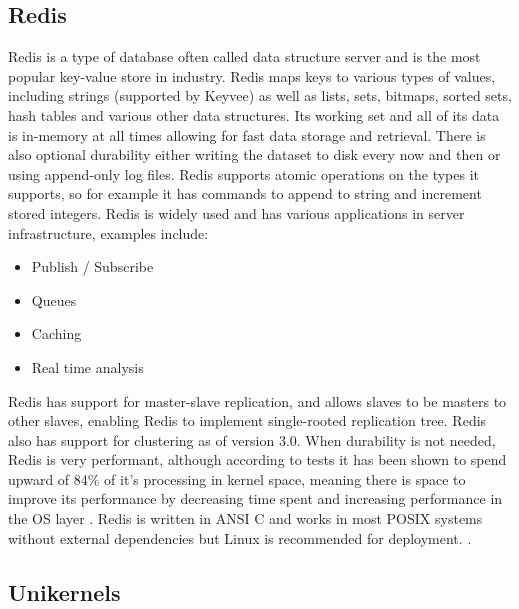 \documentclass[english,10pt,twocolumn]{article}
\begin{document}
\subsection{Redis}

Redis is a type of database often called data structure server and is the most popular key-value store in industry\cite{dbengines}.
Redis maps keys to various types of values, including strings (supported by Keyvee) as well as lists, sets, bitmaps, sorted sets, hash tables and various other data structures.
Its working set and all of its data is in-memory at all times allowing for fast data storage and retrieval.
There is also optional durability either writing the dataset to disk every now and then or using append-only log files.
Redis supports atomic operations on the types it supports, so for example it has commands to append to string and increment stored integers.
Redis is widely used and has various applications in server infrastructure, examples include:

\begin{itemize}
  \item Publish / Subscribe
  \item Queues
  \item Caching
  \item Real time analysis
\end{itemize}

Redis has support for master-slave replication, and allows slaves to be masters to other slaves, enabling Redis to implement single-rooted replication tree.
Redis also has support for clustering as of version 3.0.
When durability is not needed, Redis is very performant, although according to tests it has been shown to spend upward of 84\% of it's processing in kernel space, meaning there is space to improve its performance by decreasing time spent and increasing performance in the OS layer \cite{latency}.
Redis is written in ANSI C and works in most POSIX systems without external dependencies but Linux is recommended for deployment. \cite{redisintroduction}.

\subsection{Unikernels}
\end{document}
